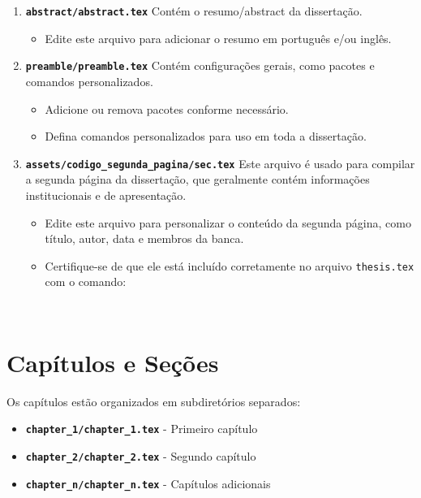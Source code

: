 \documentclass[a4paper,12pt]{article}
\begin{document}
\begin{enumerate}
    \item \textbf{\texttt{abstract/abstract.tex}}  
    Contém o resumo/abstract da dissertação.  
    \begin{itemize}
        \item Edite este arquivo para adicionar o resumo em português e/ou inglês.
    \end{itemize}

    \item \textbf{\texttt{preamble/preamble.tex}}  
    Contém configurações gerais, como pacotes e comandos personalizados.  
    \begin{itemize}
        \item Adicione ou remova pacotes conforme necessário.
        \item Defina comandos personalizados para uso em toda a dissertação.
    \end{itemize}

    \item \textbf{\texttt{assets/codigo\_segunda\_pagina/sec.tex}}  
    Este arquivo é usado para compilar a segunda página da dissertação, que geralmente contém informações institucionais e de apresentação.  
    \begin{itemize}
        \item Edite este arquivo para personalizar o conteúdo da segunda página, como título, autor, data e membros da banca.
        \item Certifique-se de que ele está incluído corretamente no arquivo \texttt{thesis.tex} com o comando:
        \begin{verbatim}
        
        \end{verbatim}
    \end{itemize}
\end{enumerate}

\section*{Capítulos e Seções}

Os capítulos estão organizados em subdiretórios separados:
\begin{itemize}
    \item \textbf{\texttt{chapter\_1/chapter\_1.tex}} - Primeiro capítulo
    \item \textbf{\texttt{chapter\_2/chapter\_2.tex}} - Segundo capítulo
    \item \textbf{\texttt{chapter\_n/chapter\_n.tex}} - Capítulos adicionais
\end{itemize}
\end{document}
